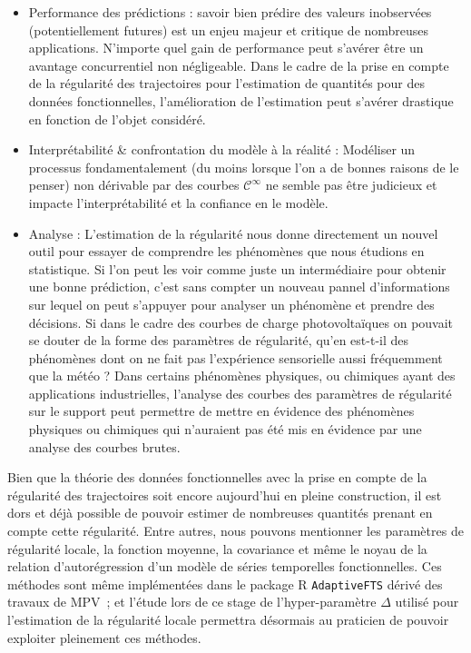 \begin{itemize}
	\item Performance des prédictions : savoir bien prédire des valeurs inobservées (potentiellement futures) est un enjeu majeur et critique de nombreuses applications. N'importe quel gain de performance peut s'avérer être un avantage concurrentiel non négligeable. Dans le cadre de la prise en compte de la régularité des trajectoires pour l'estimation de quantités pour des données fonctionnelles, l'amélioration de l'estimation peut s'avérer drastique en fonction de l'objet considéré. 
	\item Interprétabilité \& confrontation du modèle à la réalité : Modéliser un processus fondamentalement (du moins lorsque l'on a de bonnes raisons de le penser) non dérivable par des courbes $\mathcal C^\infty$ ne semble pas être judicieux et impacte l'interprétabilité et la confiance en le modèle.
	\item Analyse : L'estimation de la régularité nous donne directement un nouvel outil pour essayer de comprendre les phénomènes que nous étudions en statistique. Si l'on peut les voir comme juste un intermédiaire pour obtenir une bonne prédiction, c'est sans compter un nouveau pannel d'informations sur lequel on peut s'appuyer pour analyser un phénomène et prendre des décisions. Si dans le cadre des courbes de charge photovoltaïques on pouvait se douter de la forme des paramètres de régularité, qu'en est-t-il des phénomènes dont on ne fait pas l'expérience sensorielle aussi fréquemment que la météo ? Dans certains phénomènes physiques, ou chimiques ayant des applications industrielles, l'analyse des courbes des paramètres de régularité sur le support peut permettre de mettre en évidence des phénomènes physiques ou chimiques qui n'auraient pas été mis en évidence par une analyse des courbes brutes.
\end{itemize}

\bigskip

Bien que la théorie des données fonctionnelles avec la prise en compte de la régularité des trajectoires soit encore aujourd'hui en pleine construction, il est dors et déjà possible de pouvoir estimer de nombreuses quantités prenant en compte cette régularité. Entre autres, nous pouvons mentionner les paramètres de régularité locale, la fonction moyenne, la covariance et même le noyau de la relation d'autorégression d'un modèle de séries temporelles fonctionnelles. Ces méthodes sont même implémentées dans le package R \texttt{AdaptiveFTS} dérivé des travaux de MPV~\cite{maissoro-SmoothnessFTSweakDep}; et l'étude lors de ce stage de l'hyper-paramètre $\Delta$ utilisé pour l'estimation de la régularité locale permettra désormais au praticien de pouvoir exploiter pleinement ces méthodes.
